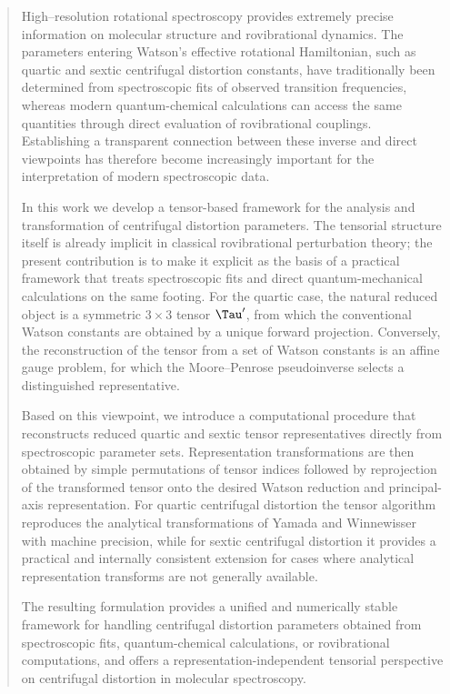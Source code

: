 \begin{abstract}
High--resolution rotational spectroscopy provides extremely precise
information on molecular structure and rovibrational dynamics.
The parameters entering Watson's effective rotational Hamiltonian,
such as quartic and sextic centrifugal distortion constants, have
traditionally been determined from spectroscopic fits of observed
transition frequencies, whereas modern quantum-chemical calculations
can access the same quantities through direct evaluation of
rovibrational couplings.  Establishing a transparent connection
between these inverse and direct viewpoints has therefore become
increasingly important for the interpretation of modern spectroscopic
data.

In this work we develop a tensor-based framework for the analysis and
transformation of centrifugal distortion parameters.  The tensorial
structure itself is already implicit in classical rovibrational
perturbation theory; the present contribution is to make it explicit
as the basis of a practical framework that treats spectroscopic fits
and direct quantum-mechanical calculations on the same footing.
For the quartic case, the natural reduced object is a symmetric
$3\times3$ tensor $\Tau'$, from which the conventional Watson
constants are obtained by a unique forward projection.  Conversely,
the reconstruction of the tensor from a set of Watson constants is an
affine gauge problem, for which the Moore--Penrose pseudoinverse
selects a distinguished representative.

Based on this viewpoint, we introduce a computational procedure that
reconstructs reduced quartic and sextic tensor representatives
directly from spectroscopic parameter sets.  Representation
transformations are then obtained by simple permutations of tensor
indices followed by reprojection of the transformed tensor onto the
desired Watson reduction and principal-axis representation.  For
quartic centrifugal distortion the tensor algorithm reproduces the
analytical transformations of Yamada and Winnewisser with machine
precision, while for sextic centrifugal distortion it provides a
practical and internally consistent extension for cases where
analytical representation transforms are not generally available.

The resulting formulation provides a unified and numerically stable
framework for handling centrifugal distortion parameters obtained from
spectroscopic fits, quantum-chemical calculations, or rovibrational
computations, and offers a representation-independent tensorial
perspective on centrifugal distortion in molecular spectroscopy.
\end{abstract}
